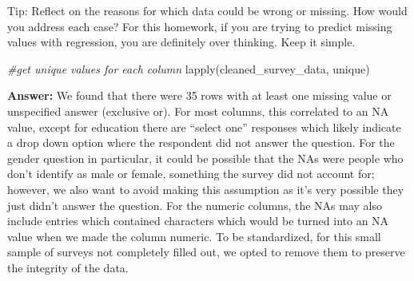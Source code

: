 \documentclass[
]{article}
\newenvironment{Shaded}{\begin{snugshade}}{\end{snugshade}}
\newcommand{\CommentTok}[1]{\textcolor[rgb]{0.56,0.35,0.01}{\textit{#1}}}
\newcommand{\DecValTok}[1]{\textcolor[rgb]{0.00,0.00,0.81}{#1}}
\newcommand{\FunctionTok}[1]{\textcolor[rgb]{0.00,0.00,0.00}{#1}}
\newcommand{\NormalTok}[1]{#1}
\newcommand{\OtherTok}[1]{\textcolor[rgb]{0.56,0.35,0.01}{#1}}
\newcommand{\SpecialCharTok}[1]{\textcolor[rgb]{0.00,0.00,0.00}{#1}}
\newcommand{\StringTok}[1]{\textcolor[rgb]{0.31,0.60,0.02}{#1}}
\begin{document}
Tip: Reflect on the reasons for which data could be wrong or missing.
How would you address each case? For this homework, if you are trying to
predict missing values with regression, you are definitely over
thinking. Keep it simple.

\begin{Shaded}
\begin{Highlighting}[]
\CommentTok{\#get unique values for each column}
\FunctionTok{lapply}\NormalTok{(cleaned\_survey\_data, unique)}
\end{Highlighting}
\end{Shaded}

\textbf{Answer:} We found that there were 35 rows with at least one
missing value or unspecified answer (exclusive or). For most columns,
this correlated to an NA value, except for education there are ``select
one'' responses which likely indicate a drop down option where the
respondent did not answer the question. For the gender question in
particular, it could be possible that the NAs were people who don't
identify as male or female, something the survey did not account for;
however, we also want to avoid making this assumption as it's very
possible they just didn't answer the question. For the numeric columns,
the NAs may also include entries which contained characters which would
be turned into an NA value when we made the column numeric. To be
standardized, for this small sample of surveys not completely filled
out, we opted to remove them to preserve the integrity of the data.

\begin{Shaded}
\end{Shaded}

\begin{Shaded}
\end{Shaded}
\end{document}
